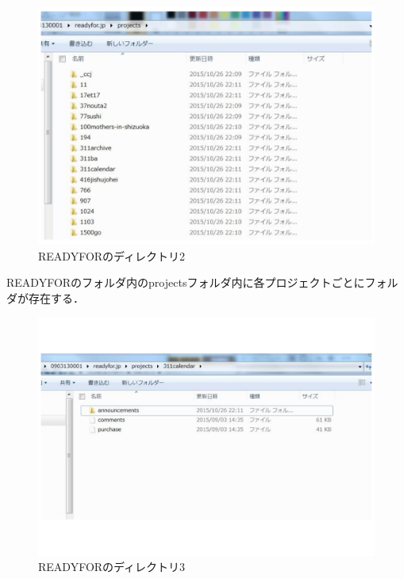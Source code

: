 \begin{figure}[H]
\centering
\includegraphics[width=13cm]{figure31.pdf}
\caption{READYFORのディレクトリ2}\label{sannp}
\end{figure}

READYFORのフォルダ内のprojectsフォルダ内に各プロジェクトごとにフォルダが存在する．


\begin{figure}[H]
\centering
\includegraphics[width=13cm]{figure34.pdf}
\caption{READYFORのディレクトリ3}\label{sannp}
\end{figure}

